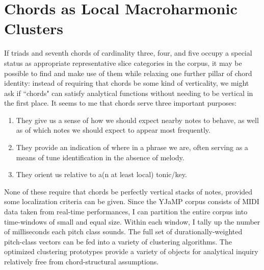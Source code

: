 \section{Chords as Local Macroharmonic Clusters}
If triads and seventh chords of cardinality three, four, and five occupy a special status as appropriate representative slice categories in the corpus, it may be possible to find and make use of them while relaxing one further pillar of chord identity: instead of requiring that chords be some kind of verticality, we might ask if ``chords" can satisfy analytical functions without needing to be vertical in the first place.  It seems to me that chords serve three important purposes:
\begin{enumerate}
	\item They give us a sense of how we should expect nearby notes to behave, as well as of which notes we should expect to appear most frequently.
	\item They provide an indication of where in a phrase we are, often serving as a means of tune identification in the absence of melody.
	\item They orient us relative to a(n at least local) tonic/key.
\end{enumerate}
None of these require that chords be perfectly vertical stacks of notes, provided some localization criteria can be given.  Since the YJaMP corpus consists of MIDI data taken from real-time performances, I can partition the entire corpus into time-windows of small and equal size.  Within each window, I tally up the number of milliseconds each pitch class sounds.  The full set of durationally-weighted pitch-class vectors can be fed into a variety of clustering algorithms.  The optimized clustering prototypes provide a variety of objects for analytical inquiry relatively free from chord-structural assumptions.

